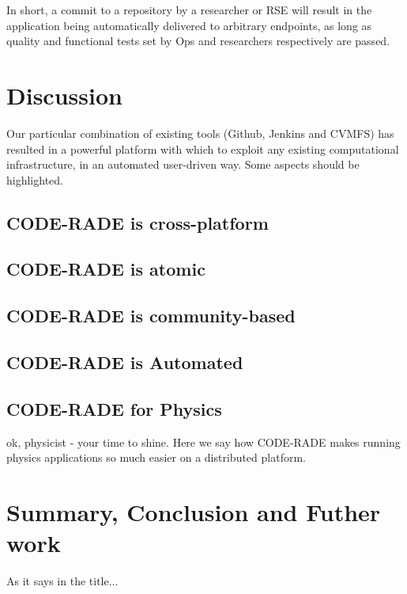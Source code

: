 \documentclass[a4paper]{jpconf}
\begin{document}
In short, a commit to a repository by a researcher or RSE will result in the application being automatically delivered to arbitrary endpoints, as long as quality and functional tests set by Ops and researchers respectively are passed.

	\section{Discussion}\label{Discussion}

Our particular combination of existing tools (Github, Jenkins and CVMFS) has resulted in a powerful platform with which to exploit any existing computational infrastructure, in an automated user-driven way. Some aspects should be highlighted.

\subsection{CODE-RADE is cross-platform}

\subsection{CODE-RADE is atomic}

\subsection{CODE-RADE is community-based}

\subsection{CODE-RADE is Automated}



	\subsection{CODE-RADE for Physics}

	ok, physicist - your time to shine. Here we say how CODE-RADE makes running physics applications so much easier on a distributed platform.

	\section{Summary, Conclusion and Futher work}

	As it says in the title...
\end{document}
